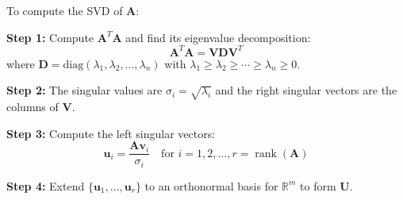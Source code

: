 \documentclass[12pt]{article}
\numberwithin{equation}{section}
\newcommand{\vect}[1]{\boldsymbol{#1}}   %
\newcommand{\mat}[1]{\mathbf{#1}}        %
\newcommand{\rank}{\operatorname{rank}}
\theoremstyle{plain}
\theoremstyle{definition}
\theoremstyle{remark}
\begin{document}
\begin{algorithm}[H]
\caption{Computing SVD via Eigenvalue Decomposition}
To compute the SVD of $\mat{A}$:

\textbf{Step 1:} Compute $\mat{A}^T\mat{A}$ and find its eigenvalue decomposition:
$$\mat{A}^T\mat{A} = \mat{V}\mat{D}\mat{V}^T$$
where $\mat{D} = \text{diag}(\lambda_1, \lambda_2, \ldots, \lambda_n)$ with $\lambda_1 \geq \lambda_2 \geq \cdots \geq \lambda_n \geq 0$.

\textbf{Step 2:} The singular values are $\sigma_i = \sqrt{\lambda_i}$ and the right singular vectors are the columns of $\mat{V}$.

\textbf{Step 3:} Compute the left singular vectors:
$$\vect{u}_i = \frac{\mat{A}\vect{v}_i}{\sigma_i} \quad \text{for } i = 1, 2, \ldots, r = \rank(\mat{A})$$

\textbf{Step 4:} Extend $\{\vect{u}_1, \ldots, \vect{u}_r\}$ to an orthonormal basis for $\mathbb{R}^m$ to form $\mat{U}$.
\end{algorithm}
\end{document}
